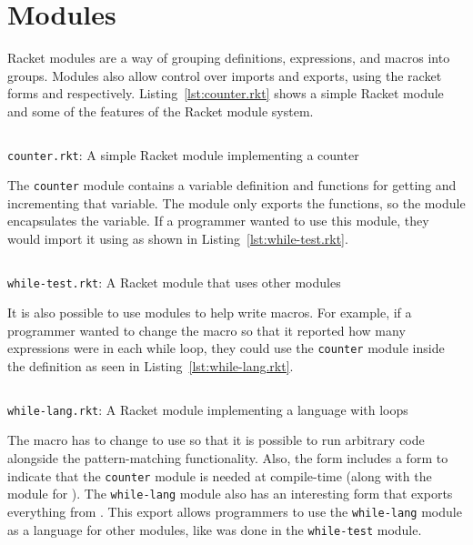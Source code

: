 \section{Modules}
Racket modules are a way of grouping definitions, expressions, and macros into groups. 
Modules also allow control over imports and exports, using the racket forms  and  respectively.
Listing~\ref{lst:counter.rkt} shows a simple Racket module and some of the features of the Racket module system.
\begin{listing}
  \inputminted{racket}{listings/counter.rkt}
  \caption{\texttt{counter.rkt}: A simple Racket module implementing a counter}
  \label{lst:counter.rkt}
\end{listing}
The \texttt{counter} module contains a variable definition and functions for getting and incrementing that variable.
The module only exports the functions, so the module encapsulates the variable.
If a programmer wanted to use this module, they would import it using  as shown in Listing~\ref{lst:while-test.rkt}. 

\begin{listing}
  \inputminted{racket}{listings/while-test.rkt}
  \caption{\texttt{while-test.rkt}: A Racket module that uses other modules}
  \label{lst:while-test.rkt}
\end{listing}

It is also possible to use modules to help write macros.
For example, if a programmer wanted to change the  macro so that it reported how many expressions were in each while loop, they could use the \texttt{counter} module inside the  definition as seen in Listing~\ref{lst:while-lang.rkt}.
\begin{listing}
  \inputminted{racket}{listings/while-lang.rkt}
  \caption{\texttt{while-lang.rkt}: A Racket module implementing a language with  loops}
  \label{lst:while-lang.rkt}
\end{listing}
The  macro has to change to use  so that it is possible to run arbitrary code alongside the pattern-matching functionality.
Also, the  form includes a  form to indicate that the \texttt{counter} module is needed at compile-time (along with the  module for ).
The \texttt{while-lang} module also has an interesting  form that exports everything from .
This export allows programmers to use the \texttt{while-lang} module as a language for other modules, like was done in the \texttt{while-test} module.

